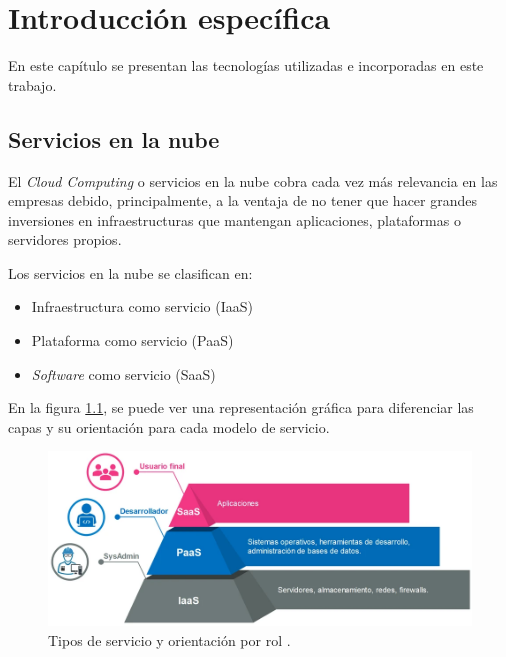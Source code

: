 \chapter{Introducción específica} %

\label{Chapter2}

En este capítulo se presentan las tecnologías utilizadas e incorporadas en este trabajo. 


\section{Servicios en la nube}
El \emph{Cloud Computing} o servicios en la nube cobra cada vez más relevancia en las empresas debido, principalmente, a la ventaja de no tener que hacer grandes inversiones en infraestructuras que mantengan aplicaciones, plataformas o servidores propios.

Los servicios en la nube se clasifican en:

\begin{itemize}
\item Infraestructura como servicio (IaaS)
\item Plataforma como servicio (PaaS)
\item \emph{Software} como servicio (SaaS)
\end{itemize}

En la figura \ref{fig:servicios}, se puede ver una representación gráfica para diferenciar las capas y su orientación para cada modelo de servicio.
\vspace{0.5cm}

\begin{figure}[htbp]
	\centering
	\includegraphics[width=1.0\textwidth]{./Figures/servicios.png}
	\caption{Tipos de servicio y orientación por rol \protect\footnotemark.}

	\label{fig:servicios}
\end{figure}

